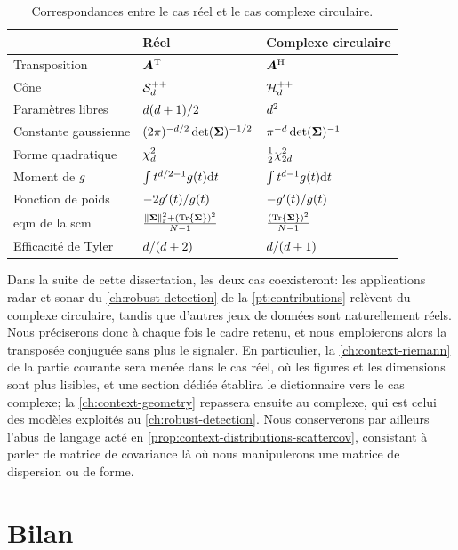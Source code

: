 \begin{table}[h]
  \centering
  \caption{Correspondances entre le cas réel et le cas complexe circulaire.}
  \label{tab:context-complex-summary}
  \small
  \begin{tabular}{@{}lll@{}}
    \toprule
     & Réel & Complexe circulaire \\
    \midrule
    Transposition & $\boldsymbol{A}^{\mathrm{T}}$ & $\boldsymbol{A}^{\mathrm{H}}$ \\
    Cône & $\mathcal{S}_{d}^{++}$ & $\mathcal{H}_{d}^{++}$ \\
    Paramètres libres & $d(d+1)/2$ & $d^2$ \\
    Constante gaussienne & $(2\pi)^{-d/2}\operatorname{\operatorname{det}}(\boldsymbol{\Sigma})^{-1/2}$ & $\pi^{-d}\operatorname{\operatorname{det}}(\boldsymbol{\Sigma})^{-1}$ \\
    Forme quadratique & $\chi^2_d$ & $\tfrac12\chi^2_{2d}$ \\
    Moment de $g$ & $\int t^{d/2-1}g(t)\mathrm{d} t$ & $\int t^{d-1}g(t)\mathrm{d} t$ \\
    Fonction de poids & $-2g'(t)/g(t)$ & $-g'(t)/g(t)$ \\
    eqm de la scm & $\frac{\|\boldsymbol{\Sigma}\|_{\mathbb{F}}^2+(\operatorname{\operatorname{Tr}}\left\{\boldsymbol{\Sigma}\right\})^2}{N-1}$ & $\frac{(\operatorname{\operatorname{Tr}}\left\{\boldsymbol{\Sigma}\right\})^2}{N-1}$ \\[1.2ex]
    Efficacité de Tyler & $d/(d+2)$ & $d/(d+1)$ \\
    \bottomrule
  \end{tabular}
\end{table}

Dans la suite de cette dissertation, les deux cas coexisteront: les applications radar et sonar du \cref{ch:robust-detection} de la \cref{pt:contributions} relèvent du complexe circulaire, tandis que d'autres jeux de données sont naturellement réels. Nous préciserons donc à chaque fois le cadre retenu, et nous emploierons alors la transposée conjuguée sans plus le signaler. En particulier, la \cref{ch:context-riemann} de la partie courante sera menée dans le cas réel, où les figures et les dimensions sont plus lisibles, et une section dédiée établira le dictionnaire vers le cas complexe; la \cref{ch:context-geometry} repassera ensuite au complexe, qui est celui des modèles exploités au \cref{ch:robust-detection}. Nous conserverons par ailleurs l'abus de langage acté en \cref{prop:context-distributions-scattercov}, consistant à parler de matrice de covariance là où nous manipulerons une matrice de dispersion ou de forme.


\section{Bilan}
\label{sec:context-distributions-bilan}

